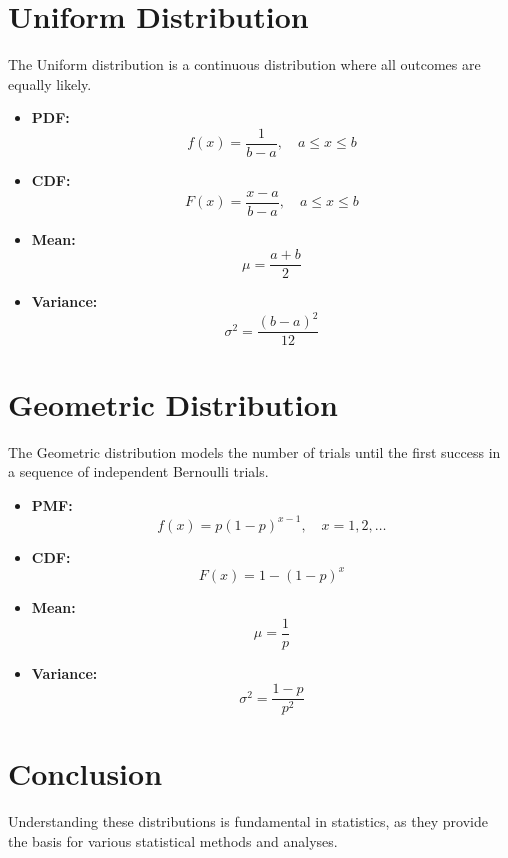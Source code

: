 \documentclass{article}
\begin{document}
\section{Uniform Distribution}
The Uniform distribution is a continuous distribution where all outcomes are equally likely.

\begin{itemize}
    \item \textbf{PDF:} 
    \[
    f(x) = \frac{1}{b-a}, \quad a \leq x \leq b
    \]
    \item \textbf{CDF:} 
    \[
    F(x) = \frac{x-a}{b-a}, \quad a \leq x \leq b
    \]
    \item \textbf{Mean:} 
    \[
    \mu = \frac{a + b}{2}
    \]
    \item \textbf{Variance:} 
    \[
    \sigma^2 = \frac{(b - a)^2}{12}
    \]
\end{itemize}

\section{Geometric Distribution}
The Geometric distribution models the number of trials until the first success in a sequence of independent Bernoulli trials.

\begin{itemize}
    \item \textbf{PMF:} 
    \[
    f(x) = p(1-p)^{x-1}, \quad x = 1, 2, \ldots
    \]
    \item \textbf{CDF:} 
    \[
    F(x) = 1 - (1-p)^{x}
    \]
    \item \textbf{Mean:} 
    \[
    \mu = \frac{1}{p}
    \]
    \item \textbf{Variance:} 
    \[
    \sigma^2 = \frac{1-p}{p^2}
    \]
\end{itemize}

\section*{Conclusion}
Understanding these distributions is fundamental in statistics, as they provide the basis for various statistical methods and analyses.
\end{document}
